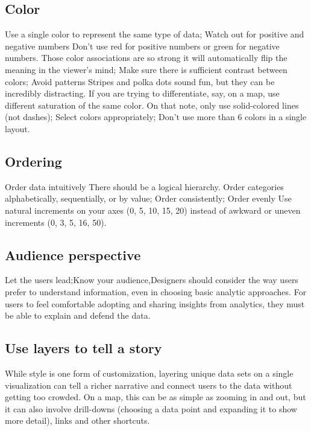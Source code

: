 \documentclass[]{book}
\theoremstyle{definition}
\theoremstyle{definition}
\theoremstyle{definition}
\theoremstyle{remark}
\begin{document}
\subsection{Color}\label{color}

Use a single color to represent the same type of data; Watch out for
positive and negative numbers Don't use red for positive numbers or
green for negative numbers. Those color associations are so strong it
will automatically flip the meaning in the viewer's mind; Make sure
there is sufficient contrast between colors; Avoid patterns Stripes and
polka dots sound fun, but they can be incredibly distracting. If you are
trying to differentiate, say, on a map, use different saturation of the
same color. On that note, only use solid-colored lines (not dashes);
Select colors appropriately; Don't use more than 6 colors in a single
layout.

\subsection{Ordering}\label{ordering}

Order data intuitively There should be a logical hierarchy. Order
categories alphabetically, sequentially, or by value; Order
consistently; Order evenly Use natural increments on your axes (0, 5,
10, 15, 20) instead of awkward or uneven increments (0, 3, 5, 16, 50).

\subsection{Audience perspective}\label{audience-perspective}

Let the users lead;Know your audience,Designers should consider the way
users prefer to understand information, even in choosing basic analytic
approaches. For users to feel comfortable adopting and sharing insights
from analytics, they must be able to explain and defend the data.

\subsection{Use layers to tell a
story}\label{use-layers-to-tell-a-story}

While style is one form of customization, layering unique data sets on a
single visualization can tell a richer narrative and connect users to
the data without getting too crowded. On a map, this can be as simple as
zooming in and out, but it can also involve drill-downs (choosing a data
point and expanding it to show more detail), links and other shortcuts.
\end{document}
